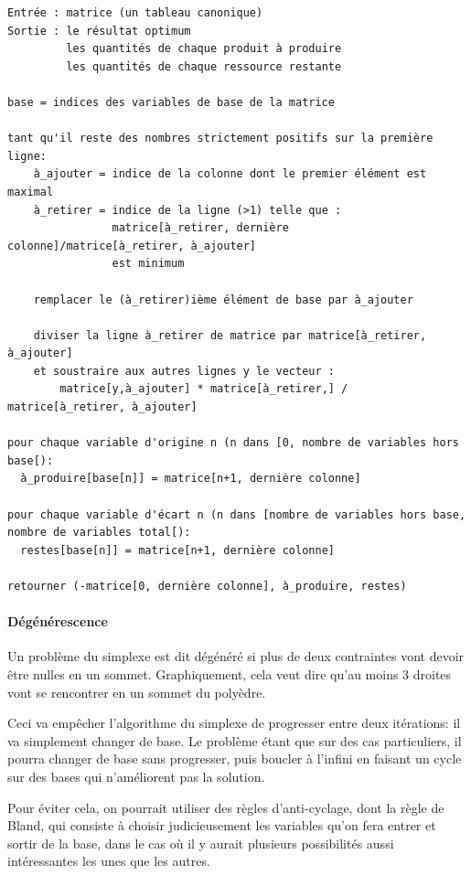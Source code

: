       \begin{lstlisting}
Entrée : matrice (un tableau canonique)
Sortie : le résultat optimum
         les quantités de chaque produit à produire
         les quantités de chaque ressource restante

base = indices des variables de base de la matrice

tant qu'il reste des nombres strictement positifs sur la première ligne:
    à_ajouter = indice de la colonne dont le premier élément est maximal
    à_retirer = indice de la ligne (>1) telle que :
                matrice[à_retirer, dernière colonne]/matrice[à_retirer, à_ajouter]
                est minimum

    remplacer le (à_retirer)ième élément de base par à_ajouter

    diviser la ligne à_retirer de matrice par matrice[à_retirer, à_ajouter]
    et soustraire aux autres lignes y le vecteur :
        matrice[y,à_ajouter] * matrice[à_retirer,] / matrice[à_retirer, à_ajouter]

pour chaque variable d'origine n (n dans [0, nombre de variables hors base[):
  à_produire[base[n]] = matrice[n+1, dernière colonne]

pour chaque variable d'écart n (n dans [nombre de variables hors base, nombre de variables total[):
  restes[base[n]] = matrice[n+1, dernière colonne]

retourner (-matrice[0, dernière colonne], à_produire, restes)
      \end{lstlisting}

    \paragraph{Dégénérescence}
      Un problème du simplexe est dit dégénéré si plus de deux contraintes vont
      devoir être nulles en un sommet. Graphiquement, cela veut dire
      qu'au moins 3 droites vont se rencontrer en un sommet du polyèdre.

      Ceci va empêcher l'algorithme du simplexe de progresser entre deux
      itérations: il va simplement changer de base. Le problème étant que sur
      des cas particuliers, il pourra changer de base sans progresser, puis
      boucler à l'infini en faisant un cycle sur des bases qui n'améliorent pas
      la solution.

      Pour éviter cela, on pourrait utiliser des règles d'anti-cyclage, dont la
      règle de Bland, qui consiste à choisir judicieusement les variables qu'on
      fera entrer et sortir de la base, dans le cas où il y aurait plusieurs
      possibilités aussi intéressantes les unes que les autres.

